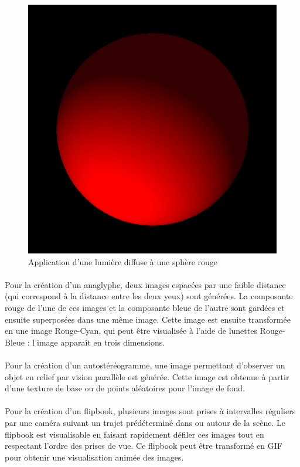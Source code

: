 \begin{figure}[h]
	\centering
	\includegraphics[scale=0.3]{boule.png}
	\caption{\label{fig:sphère} Application d’une lumière diffuse à une sphère rouge \protect \footnotemark }
\end{figure}

\paragraph{}
	Pour la création d’un anaglyphe, deux images espacées par une faible distance (qui correspond à la distance entre les deux yeux) sont générées. La composante rouge de l’une de ces images et la composante bleue de l’autre sont gardées et ensuite superposées dans une même image. Cette image est ensuite transformée en une image Rouge-Cyan, qui peut être visualisée à l’aide de lunettes Rouge-Bleue : l’image apparaît en trois dimensions.

\paragraph{}
	Pour la création d’un autostéréogramme, une image permettant d'observer un objet en relief par vision parallèle est générée. Cette image est obtenue à partir d'une texture de base ou de points aléatoires pour l'image de fond.

\paragraph{}
	Pour la création d’un flipbook, plusieurs images sont prises à intervalles réguliers par une caméra suivant un trajet prédéterminé dans ou autour de la scène. Le flipbook est visualisable en faisant rapidement défiler ces images tout en respectant l’ordre des prises de vue. Ce flipbook peut être transformé en GIF pour obtenir une visualisation animée des images.
